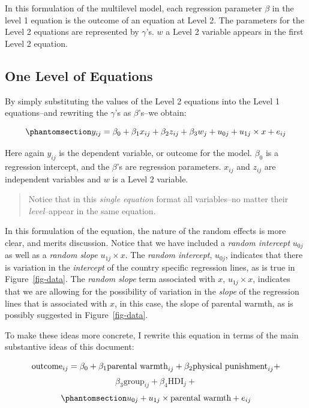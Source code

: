 \documentclass[
  letterpaper,
  DIV=11,
  numbers=noendperiod]{scrreprt}
\begin{document}
In this formulation of the multilevel model, each regression parameter
\(\beta\) in the level 1 equation is the outcome of an equation at Level
2. The parameters for the Level 2 equations are represented by
\(\gamma\)'s. \(w\) a Level 2 variable appears in the first Level 2
equation.

\subsection{One Level of Equations}\label{one-level-of-equations}

By simply substituting the values of the Level 2 equations into the
Level 1 equations--and rewriting the \(\gamma\)'s as \(\beta\)'s--we
obtain:

\begin{equation}\phantomsection\label{eq-MLM}{y_{ij} = \beta_0 + \beta_1 x_{ij} + \beta_2 z_{ij} + \beta_3 w_{j} + u_{0j} + u_{1j} \times x + e_{ij}}\end{equation}

Here again \(y_{ij}\) is the dependent variable, or outcome for the
model. \(\beta_0\) is a regression intercept, and the \(\beta\)'s are
regression parameters. \(x_{ij}\) and \(z_{ij}\) are independent
variables and \(w\) is a Level 2 variable.

\begin{quote}
Notice that in this \emph{single equation} format all variables--no
matter their \emph{level}--appear in the same equation.
\end{quote}

In this formulation of the equation, the nature of the random effects is
more clear, and merits discussion. Notice that we have included a
\emph{random intercept} \(u_{0j}\) as well as a \emph{random slope}
\(u_{1j} \times x\). The \emph{random intercept}, \(u_{0j}\), indicates
that there is variation in the \emph{intercept} of the country specific
regression lines, as is true in Figure~\ref{fig-data}. The \emph{random
slope} term associated with \(x\), \(u_{1j} \times x\), indicates that
we are allowing for the possibility of variation in the \emph{slope} of
the regression lines that is associated with \(x\), in this case, the
slope of parental warmth, as is possibly suggested in
Figure~\ref{fig-data}.

To make these ideas more concrete, I rewrite this equation in terms of
the main substantive ideas of this document:

\[\text{outcome}_{ij} = \beta_0 + \beta_1 \text{parental warmth}_{ij} + \\ \beta_2 \text{physical punishment}_{ij} +\]
\[\beta_3 \text{group}_{ij} + \beta_4 \text{HDI}_{j} + \]
\begin{equation}\phantomsection\label{eq-MLMsubstantive}{u_{0j} + u_{1j} \times \text{parental warmth} + e_{ij}}\end{equation}
\end{document}
